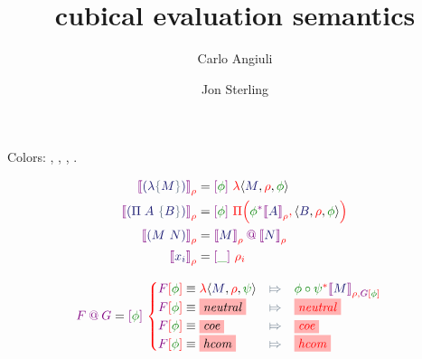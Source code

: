 \documentclass{article}
\title{cubical evaluation semantics}
\author{Carlo Angiuli \and Jon Sterling}
\newcommand\Eval[2]{
  \FmtFam{
    {\left\llbracket\FmtTm{#1}\right\rrbracket}_{\FmtVal{#2}}
  }
}
\begin{document}
\maketitle


Colors: , , , .

\begin{align*}
  \Eval{
    \TLam{M}
  }{\rho}
  &=
  \Fam{\phi}{
    \VLam{
      \VClo{M}{\rho}{\phi}
    }
  }
  \\
  \Eval{
    \TPi{A}{B}
  }{\rho}
  &=
  \Fam{\phi}{
    \VPi{
      \Rst{\phi}{\Eval{A}{\rho}}
    }{
      \VClo{B}{\rho}{\phi}
    }
  }
  \\
  \Eval{
    \TApp{M}{N}
  }{\rho}
  &=
  \SemApp{
    \Eval{M}{\rho}
  }{
    \Eval{N}{\rho}
  }
  \\
  \Eval{
    \TVar{i}
  }{\rho}
  &=
  \Fam{\_}{
    \rho_i
  }
\end{align*}

\begin{align*}
  \SemApp{F}{G}
  &=
  \Fam{\phi}{
    \begin{cases}
      \Cond{
        \FamTest{F}{\phi}
        \equiv
        \VLam{
          \VClo{M}{\rho}{\psi}
        }
      }{
        \Rst{\phi\circ\psi}{\Eval{M}{\rho, \FamTest{G}{\phi}}}
      }
      \\
      \Cond{
        \FamTest{F}{\phi}
        \equiv
        \Hole{neutral}
      }{
        \Hole{neutral}
      }
      \\
      \Cond{
        \FamTest{F}{\phi}
        \equiv
        \Hole{coe}
      }{
        \Hole{coe}
      }
      \\
      \Cond{
        \FamTest{F}{\phi}
        \equiv
        \Hole{hcom}
      }{
        \Hole{hcom}
      }
    \end{cases}
  }
\end{align*}
\end{document}
